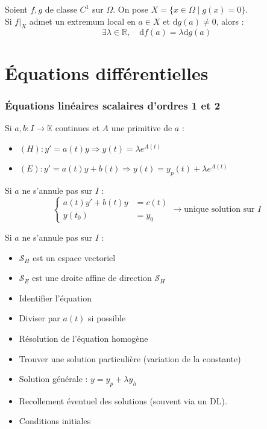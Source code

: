 \documentclass[a4paper,12pt]{report}
\newcommand{\Thm}[2]{\begin{tcolorbox}[colback=white,colframe=Red!60, title=Théorème : #1]#2\end{tcolorbox}}
\newcommand{\Methode}[2]{\begin{tcolorbox}[colback=white, title=Méthode :  #1]#2\end{tcolorbox}}
\begin{document}
\Thm{Optimisation sous contrainte}{
Soient $f, g$ de classe $C^1$ sur $\Omega$. On pose $X = \{x \in \Omega \mid g(x)=0\}$.\\
Si $f|_X$ admet un extremum local en $a \in X$ et $\mathrm{d}g(a) \neq 0$, alors :
\[ \exists \lambda \in \mathbb{R}, \quad \mathrm{d}f(a) = \lambda \mathrm{d}g(a) \]
}

\section{Équations différentielles}
\subsubsection{Équations linéaires scalaires d’ordres 1 et 2}

\Thm{Équation d'ordre 1}{
Si $a,b : I \to \mathbb{K}$ continues et $A$ une primitive de $a$ :
\begin{itemize}
    \item $(H): y'=a(t)y \Rightarrow y(t) = \lambda e^{A(t)}$
    \item $(E): y'=a(t)y+b(t) \Rightarrow y(t) = y_p(t) + \lambda e^{A(t)}$
\end{itemize}
}

\Thm{Problème de Cauchy (ordre 1)}{
Si $a$ ne s’annule pas sur $I$ :\\
\[
\left\{
\begin{aligned}
    a(t)y' + b(t)y &= c(t) \\
    y(t_0) &= y_0
\end{aligned}
\right.
\longrightarrow \text{unique solution sur } I
\]
}
\Thm{Structure des solutions (ordre 1)}{
Si $a$ ne s’annule pas sur $I$ :
\begin{itemize}
    \item $\mathcal{S}_H$ est un espace vectoriel
    \item $\mathcal{S}_E$ est une droite affine de direction $\mathcal{S}_H$
\end{itemize}
}

\Methode{Plan de résolution (ordre 1)}{
\begin{itemize}
    \item Identifier l’équation
    \item Diviser par $a(t)$ si possible
    \item Résolution de l’équation homogène
    \item Trouver une solution particulière (variation de la constante)
    \item Solution générale : $y = y_p + \lambda y_h$
    \item Recollement éventuel des solutions (souvent via un DL).
    \item Conditions initiales
\end{itemize}
}
\end{document}
